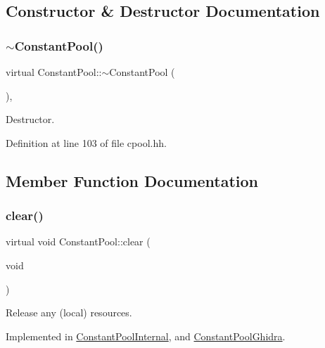 \subsection{Constructor \& Destructor Documentation}
\mbox{\label{class_constant_pool_a79f2065fd9ed9256d3b0eae79f1950e5}} 
\subsubsection{\texorpdfstring{$\sim$ConstantPool()}{~ConstantPool()}}
{\footnotesize\ttfamily virtual Constant\+Pool\+::$\sim$\+Constant\+Pool (\begin{DoxyParamCaption}{ }\end{DoxyParamCaption})\hspace{0.3cm}{\ttfamily [inline]}, {\ttfamily [virtual]}}



Destructor. 



Definition at line 103 of file cpool.\+hh.



\subsection{Member Function Documentation}
\mbox{\label{class_constant_pool_a3cb5e39704c4dacbe8782742c2f218c4}} 
\subsubsection{\texorpdfstring{clear()}{clear()}}
{\footnotesize\ttfamily virtual void Constant\+Pool\+::clear (\begin{DoxyParamCaption}\item[{void}]{ }\end{DoxyParamCaption})\hspace{0.3cm}{\ttfamily [pure virtual]}}



Release any (local) resources. 



Implemented in \mbox{\hyperlink{class_constant_pool_internal_a72e240485b635c1e82282d1ae0cbd7d5}{Constant\+Pool\+Internal}}, and \mbox{\hyperlink{class_constant_pool_ghidra_ac0b80eac8d8d3a5abf9db557ae9336fc}{Constant\+Pool\+Ghidra}}.

